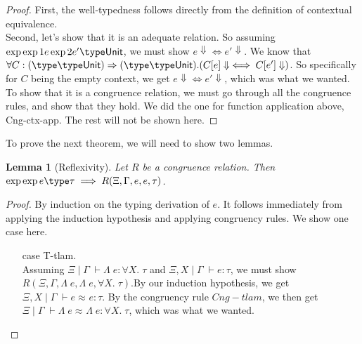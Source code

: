 \documentclass[twoside,11pt,openright]{report}
\newtheorem{lemma}[theorem]{Lemma}
\theoremstyle{definition}
\newcommand{\expr}{e}
\newcommand{\Tvar}{X}
\newcommand{\Tlam}{\Lambda\;}
\newcommand{\ctx}{C}
\newcommand{\Tunit}{\mathsf{Unit}}
\newcommand{\Tall}[2]{\forall #1.\; #2}
\newcommand{\typ}{\tau}
\newcommand{\venv}{\Gamma}
\newcommand{\tenv}{\Xi}
\newcommand{\empvenv}{\bullet}
\newcommand{\emptenv}{\bullet}
\newcommand{\jdg}[4]{#1 \; | \; #2 \; \vdash #3 : #4}
\newcommand{\jdgType}[3]{#1 \; | \; #2 \; \vdash #3}
\def\envs#1#2\exp#3\type#4{\jdg{#1}{#2}{#3}{#4}} %
\def\envstyp#1#2\type#3{\jdgType{#1}{#2}{#3}} %
\newcommand{\jdgRel}[6]{#1 \; | \; #2 \; \vdash #3 \approx^{#4} #5 : #6}
\def\envscteq#1#2\exp1#3\exp2#4\type#5
\begin{document}
\begin{proof}
  First, the well-typedness follows directly from the definition of contextual equivalence.\\
  Second, let's show that it is an adequate relation. So assuming $\envscteq \empvenv \emptenv \exp1 \expr \exp2 \expr' \type \Tunit$, we must show $\expr \Downarrow \iff \expr' \Downarrow$. We know that $\forall \ctx : (\envstyp \emptenv \empvenv \type \Tunit) \Rightarrow (\envstyp {\emptenv} {\empvenv} \type \Tunit) . (\ctx[\expr] \Downarrow \iff \ctx[\expr'] \Downarrow)$. So specifically for $C$ being the empty context, we get $\expr \Downarrow \iff \expr' \Downarrow$, which was what we wanted.\\
  To show that it is a congruence relation, we must go through all the congruence rules, and show that they hold. We did the one for function application above, Cng-ctx-app. The rest will not be shown here.
\end{proof}

To prove the next theorem, we will need to show two lemmas.
\begin{lemma}[Reflexivity]\label{lem:R_Cng_is_reflexive}
  Let $R$ be a congruence relation. Then $\envs \tenv \venv \exp \expr \type \typ \implies R(\tenv, \venv, \expr, \expr, \typ)$.
\end{lemma}
\begin{proof}
  By induction on the typing derivation of $\expr$. It follows immediately from applying the induction hypothesis and applying congruency rules. We show one case here.
  \begin{itemize}
    \item[case] T-tlam.\\
      Assuming $\jdg{\tenv}{\venv}{\Tlam \expr}{\Tall{\Tvar}{\typ}}$ and $\jdg{\tenv, \Tvar}{\venv}{\expr}{\typ}$, we must show $R(\tenv, \venv, \Tlam \expr, \Tlam \expr, \Tall{\Tvar}{\typ})$.By our induction hypothesis, we get $\jdgRel{\tenv, \Tvar}{\venv}{\expr}{}{\expr}{\typ}$. By the congruency rule $Cng-tlam$, we then get $\jdgRel{\tenv}{\venv}{\Tlam \expr}{}{\Tlam \expr}{\Tall{\Tvar}{\typ}}$, which was what we wanted.
  \end{itemize}
\end{proof}
\end{document}
